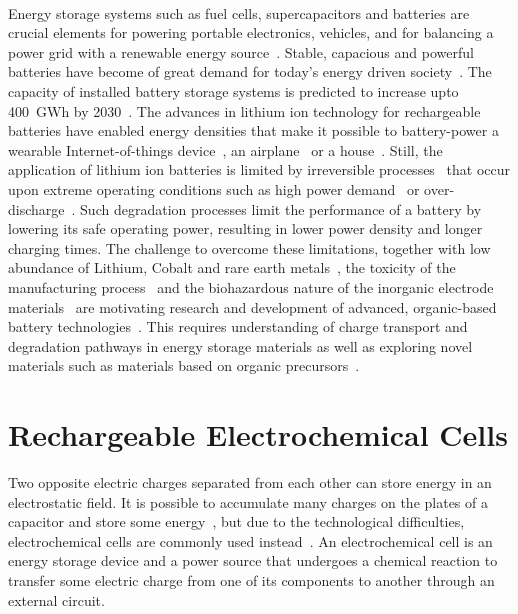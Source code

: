 \paragraph*{}
Energy storage systems such as fuel cells, supercapacitors and batteries are crucial elements for powering portable electronics, vehicles, and for balancing a power grid with a renewable energy source~\cite{janoschka2012_advmater}. Stable, capacious and powerful batteries have become of great demand for today's energy driven society~\cite{Yoo2014,Xu2020,Nitta2015}. The capacity of installed battery storage systems is predicted to increase upto 400~GWh by 2030~\cite{Figgener_2020}. The advances in lithium ion technology for rechargeable batteries have enabled energy densities that make it possible to battery-power a wearable Internet-of-things device~\cite{Lee2013,Maddikunta2020}, an airplane~\cite{Kadlec2014} or a house~\cite{Diouf2019,Hirasawa2021}. Still, the application of lithium ion batteries is limited by irreversible processes~\cite{Larsson2017,Fu2015,Zhang2021} that occur upon extreme operating conditions such as high power demand~\cite{Zhang2022,Guan2018} or over-discharge~\cite{Ma2020}. Such degradation processes limit the performance of a battery by lowering its safe operating power, resulting in lower power density and longer charging times. The challenge to overcome these limitations, together with low abundance of Lithium, Cobalt and rare earth metals~\cite{Xu2020,janoschka2012_advmater}, the toxicity of the manufacturing process~\cite{Prazanov2022,Peters2017} and the biohazardous nature of the inorganic electrode materials~\cite{Casado_2021_book} are motivating research and development of advanced, organic-based battery technologies~\cite{Degen2022}. This requires understanding of charge transport and degradation pathways in energy storage materials as well as exploring novel materials such as materials based on organic precursors~\cite{Lu2020,Kim2023}.\\

\section{Rechargeable Electrochemical Cells}
Two opposite electric charges separated from each other can store energy in an electrostatic field. It is possible to accumulate many charges on the plates of a capacitor and store some energy~\cite{He_2022}, but due to the technological difficulties, electrochemical cells are commonly used instead~\cite{Figgener_2020}. An electrochemical cell is an energy storage device and a power source that undergoes a chemical reaction to transfer some electric charge from one of its components to another through an external circuit. 

